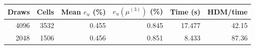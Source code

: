 \begin{tabular}{rr|rrrr}
\toprule
Draws & Cells & Mean $e_u$ (\%) & $e_u(\mu^{(3)})$ (\%) & Time (s) & HDM/time \\
\midrule
4096 & 3532 & 0.455 & 0.845 & 17.477 & 42.15 \\
2048 & 1506 & 0.456 & 0.851 & 8.433 & 87.36 \\
\bottomrule
\end{tabular}
